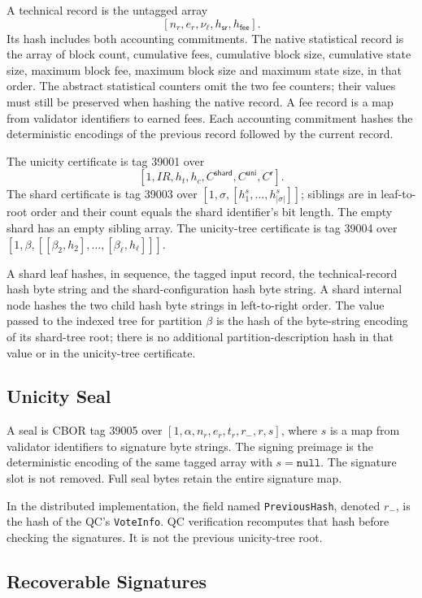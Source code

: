 A technical record is the untagged array
\[
[n_r,e_r,\nu_\ell,h_\mathsf{sr},h_\mathsf{fee}].
\]
Its hash includes both accounting commitments. The native statistical record is the array of block count, cumulative fees, cumulative block size, cumulative state size, maximum block fee, maximum block size and maximum state size, in that order. The abstract statistical counters omit the two fee counters; their values must still be preserved when hashing the native record. A fee record is a map from validator identifiers to earned fees. Each accounting commitment hashes the deterministic encodings of the previous record followed by the current record.


The unicity certificate is tag 39001 over
\[
[1,IR,h_t,h_c,C^\mathsf{shard},C^\mathsf{uni},C^\mathsf{r}].
\]
The shard certificate is tag 39003 over $[1,\sigma,[h^s_1,\ldots,h^s_{|\sigma|}]]$; siblings are in leaf-to-root order and their count equals the shard identifier's bit length. The empty shard has an empty sibling array. The unicity-tree certificate is tag 39004 over $[1,\beta,[[\beta_2,h_2],\ldots,[\beta_\ell,h_\ell]]]$.

A shard leaf hashes, in sequence, the tagged input record, the technical-record hash byte string and the shard-configuration hash byte string. A shard internal node hashes the two child hash byte strings in left-to-right order. The value passed to the indexed tree for partition $\beta$ is the hash of the byte-string encoding of its shard-tree root; there is no additional partition-description hash in that value or in the unicity-tree certificate.


\subsection{Unicity Seal}\label{sec:seal-encoding}

A seal is CBOR tag 39005 over $[1,\alpha,n_r,e_r,t_r,r_-,r,s]$, where $s$ is a map from validator identifiers to signature byte strings. The signing preimage is the deterministic encoding of the same tagged array with $s=\texttt{null}$. The signature slot is not removed. Full seal bytes retain the entire signature map.

In the distributed implementation, the field named \texttt{PreviousHash}, denoted $r_-$, is the hash of the QC's \texttt{VoteInfo}. QC verification recomputes that hash before checking the signatures. It is not the previous unicity-tree root.

\subsection{Recoverable Signatures}\label{sec:recoverable-signatures}


